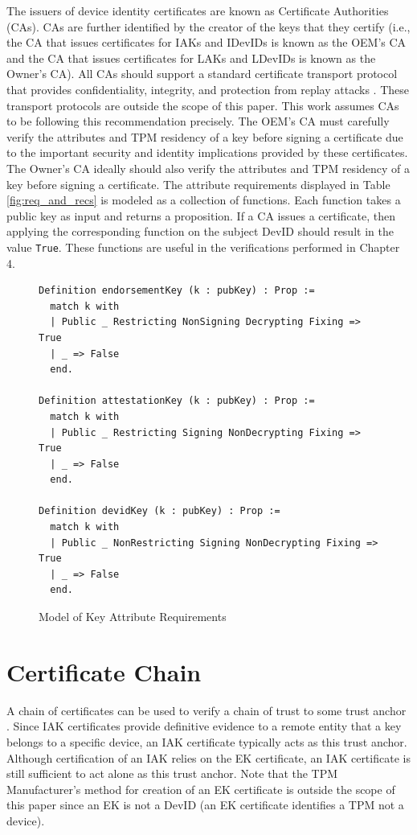 The issuers of device identity certificates are known as Certificate Authorities (CAs). CAs are further identified by the creator of the keys that they certify (i.e., the CA that issues certificates for IAKs and IDevIDs is known as the OEM's CA and the CA that issues certificates for LAKs and LDevIDs is known as the Owner's CA). All CAs should support a standard certificate transport protocol that provides confidentiality, integrity, and protection from replay attacks \cite{DevIDSpec-TCG}. These transport protocols are outside the scope of this paper. This work assumes CAs to be following this recommendation precisely. The OEM's CA must carefully verify the attributes and TPM residency of a key before signing a certificate due to the important security and identity implications provided by these certificates. The Owner's CA ideally should also verify the attributes and TPM residency of a key before signing a certificate. The attribute requirements displayed in Table \ref{fig:req_and_recs} is modeled as a collection of functions. Each function takes a public key as input and returns a proposition. If a CA issues a certificate, then applying the corresponding function on the subject DevID should result in the value \verb|True|. These functions are useful in the verifications performed in Chapter 4.
\begin{figure}[h]
\begin{lstlisting}[language=Coq]
Definition endorsementKey (k : pubKey) : Prop :=
  match k with
  | Public _ Restricting NonSigning Decrypting Fixing => True
  | _ => False
  end.

Definition attestationKey (k : pubKey) : Prop :=
  match k with
  | Public _ Restricting Signing NonDecrypting Fixing => True
  | _ => False
  end.

Definition devidKey (k : pubKey) : Prop :=
  match k with
  | Public _ NonRestricting Signing NonDecrypting Fixing => True
  | _ => False
  end.
\end{lstlisting}
\caption{Model of Key Attribute Requirements}
\end{figure}
 




\section{Certificate Chain}

A chain of certificates can be used to verify a chain of trust to some trust anchor \cite{DevIDSpec-TCG}. Since IAK certificates provide definitive evidence to a remote entity that a key belongs to a specific device, an IAK certificate typically acts as this trust anchor. 
Although certification of an IAK relies on the EK certificate, an IAK certificate is still sufficient to act alone as this trust anchor. Note that the TPM Manufacturer's method for creation of an EK certificate is outside the scope of this paper since an EK is not a DevID (an EK certificate identifies a TPM not a device). 


